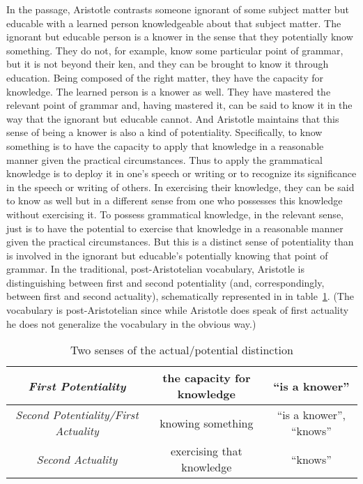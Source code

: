 In the passage, Aristotle contrasts someone ignorant of some subject matter but educable with a learned person knowledgeable about that subject matter. The ignorant but educable person is a knower in the sense that they potentially know something. They do not, for example, know some particular point of grammar, but it is not beyond their ken, and they can be brought to know it through education. Being composed of the right matter, they have the capacity for knowledge. The learned person is a knower as well. They have mastered the relevant point of grammar and, having mastered it, can be said to know it in the way that the ignorant but educable cannot. And Aristotle maintains that this sense of being a knower is also a kind of potentiality. Specifically, to know something is to have the capacity to apply that knowledge in a reasonable manner given the practical circumstances. Thus to apply the grammatical knowledge is to deploy it in one's speech or writing or to recognize its significance in the speech or writing of others. In exercising their knowledge, they can be said to know as well but in a different sense from one who possesses this knowledge without exercising it. To possess grammatical knowledge, in the relevant sense, just is to have the potential to exercise that knowledge in a reasonable manner given the practical circumstances. But this is a distinct sense of potentiality than is involved in the ignorant but educable's potentially knowing that point of grammar.  In the traditional, post-Aristotelian vocabulary, Aristotle is distinguishing between first and second potentiality (and, correspondingly, between first and second actuality), schematically represented in in table~\ref{tab:triple}. (The vocabulary is post-Aristotelian since while Aristotle does speak of first actuality he does not generalize the vocabulary in the obvious way.)

\begin{table}[htbp]
	\centering
		\begin{tabular}{ccc}
			\hline
			\emph{First Potentiality} & the capacity for knowledge & ``is a knower''\\
			\hline
			\emph{Second Potentiality/First Actuality} & knowing something & ``is a knower'', ``knows''\\
			\hline
			\emph{Second Actuality} & exercising that knowledge & ``knows''\\
			\hline
		\end{tabular}
	\caption{Two senses of the actual/potential distinction}
	\label{tab:triple}
\end{table}

